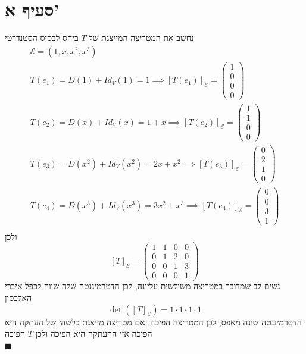 \documentclass[12pt, titlepage]{article}
\begin{document}
\section*{סעיף א'}
נחשב את המטריצה המייצגת של $T$ ביחס לבסיס הסטנדרטי
\begin{gather*}
    \mathcal{E} = \left(1,x,x^2,x^3\right)\\
    T\left(e_1\right) = D\left(1\right) + Id_V\left(1\right) =  1 \implies \left[T\left(e_1\right)\right]_{\mathcal{E}} = \begin{pmatrix} 1 \\ 0 \\ 0 \\ 0 \end{pmatrix} \\
    T\left(e_2\right) = D\left(x\right) + Id_V\left(x\right) = 1+x \implies \left[T\left(e_2\right)\right]_{\mathcal{E}} = \begin{pmatrix} 1 \\ 1 \\ 0 \\ 0 \end{pmatrix}\\
    T\left(e_3\right) = D\left(x^2\right) + Id_V\left(x^2\right) = 2x+x^2 \implies \left[T\left(e_3\right)\right]_{\mathcal{E}} = \begin{pmatrix} 0 \\ 2 \\ 1 \\ 0 \end{pmatrix}\\
    T\left(e_4\right) = D\left(x^3\right) + Id_V\left(x^3\right) = 3x^2+x^3 \implies \left[T\left(e_4\right)\right]_{\mathcal{E}} = \begin{pmatrix} 0 \\ 0 \\ 3 \\ 1 \end{pmatrix}\\
\end{gather*}
ולכן
\[
    \left[T\right]_\mathcal{E} = \begin{pmatrix}
        1 & 1 & 0 & 0 \\
        0 & 1 & 2 & 0 \\
        0 & 0 & 1 & 3 \\
        0 & 0 & 0 & 1
    \end{pmatrix}
\]
נשים לב שמדובר במטריצה משולשית עליונה, לכן הדטרמיננטה שלה שווה לכפל איברי האלכסון
\[
    \det\left(\left[T\right]_\mathcal{E}\right) = 1 \cdot 1 \cdot 1 \cdot 1
\]
הדטרמיננטה שונה מאפס, לכן המטריצה הפיכה. אם מטריצה מייצגת כלשהי של העתקה היא הפיכה אזי ההעתקה היא הפיכה ולכן $T$ הפיכה\\
$\blacksquare$
\end{document}

